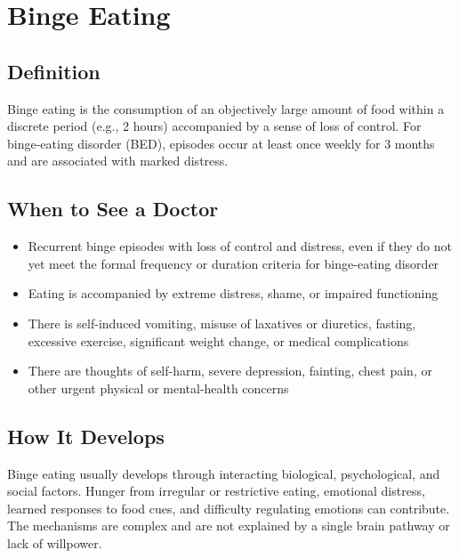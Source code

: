 \chapter{Binge Eating}

\section*{Definition}
Binge eating is the consumption of an objectively large amount of food within a discrete period (e.g., 2 hours) accompanied by a sense of loss of control. For binge-eating disorder (BED), episodes occur at least once weekly for 3 months and are associated with marked distress.

\section*{When to See a Doctor}

\begin{itemize}
 \item Recurrent binge episodes with loss of control and distress, even if they do not yet meet the formal frequency or duration criteria for binge-eating disorder
 \item Eating is accompanied by extreme distress, shame, or impaired functioning
 \item There is self-induced vomiting, misuse of laxatives or diuretics, fasting, excessive exercise, significant weight change, or medical complications
 \item There are thoughts of self-harm, severe depression, fainting, chest pain, or other urgent physical or mental-health concerns
\end{itemize}

\section*{How It Develops}
Binge eating usually develops through interacting biological, psychological, and social factors. Hunger from irregular or restrictive eating, emotional distress, learned responses to food cues, and difficulty regulating emotions can contribute. The mechanisms are complex and are not explained by a single brain pathway or lack of willpower.

